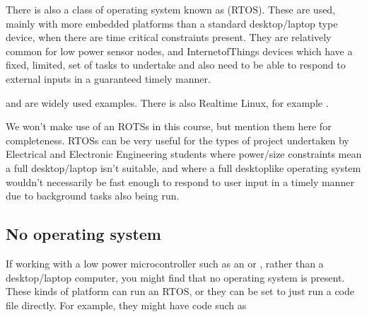 \documentclass[letterpaper,10pt,british]{sphinxmanual}
\begin{document}
\sphinxAtStartPar
There is also a class of operating system known as  (RTOS). These are used, mainly with more embedded platforms than a standard desktop/laptop type device, when there are time critical constraints present. They are relatively common for low power sensor nodes, and Internet\sphinxhyphen{}of\sphinxhyphen{}Things devices which have a fixed, limited, set of tasks to undertake and also need to be able to respond to external inputs in a guaranteed timely manner.

\sphinxAtStartPar
{} and  are widely used examples. There is also Real\sphinxhyphen{}time Linux, for example .

\sphinxAtStartPar
We won’t make use of an ROTSs in this course, but mention them here for completeness. RTOSs can be very useful for the types of project undertaken by Electrical and Electronic Engineering students where power/size constraints mean a full desktop/laptop isn’t suitable, and where a full desktop\sphinxhyphen{}like operating system wouldn’t necessarily be fast enough to respond to user input in a timely manner due to background tasks also being run.


\subsection{No operating system}
\label{\detokenize{chapters/computer_software/major_operating_systems:no-operating-system}}
\sphinxAtStartPar
If working with a low power micro\sphinxhyphen{}controller such as an  or , rather than a desktop/laptop computer, you might find that no operating system is present. These kinds of platform can run an RTOS, or they can be set to just run a code file directly. For example, they might have code such as

\begin{sphinxVerbatim}[commandchars=\\\{\}]
\end{sphinxVerbatim}
\end{document}
